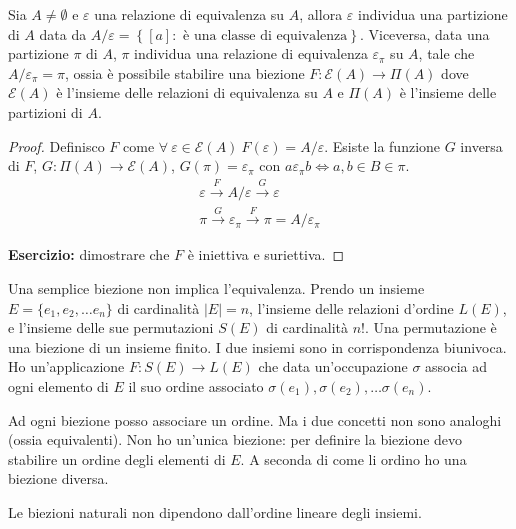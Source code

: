 \begin{prop}
Sia $A \neq \emptyset$ e $\varepsilon$ una relazione di equivalenza su $A$, allora $\varepsilon$ individua una partizione di $A$ data da $A / \varepsilon = \left \{ [a] :  \text{ \`e una classe di equivalenza}  \right \}$. Viceversa, data una partizione $\pi$ di $A$, $\pi$ individua una relazione di equivalenza $\varepsilon_{\pi}$ su $A$, tale che $A / \varepsilon_{\pi} = \pi$, ossia \`e possibile stabilire una biezione $F: \mathcal{E}(A) \to \Pi(A)$ dove $\mathcal{E}(A)$ \`e l'insieme delle relazioni di equivalenza su $A$ e $\Pi(A)$ \`e l'insieme delle partizioni di $A$.
\end{prop}
\begin{proof}
Definisco $F$ come $\forall \ \varepsilon \in \mathcal{E}(A) \ F(\varepsilon) = A / \varepsilon$. Esiste la funzione $G$ inversa di $F$, $G : \Pi(A) \to \mathcal{E}(A)$, $G(\pi) = \varepsilon_{\pi}$ con $a \varepsilon_{\pi} b \Leftrightarrow a,b \in B \in \pi$.
\begin{gather*}
\varepsilon \xrightarrow{F} A / \varepsilon \xrightarrow{G} \varepsilon \\
\pi \xrightarrow{G} \varepsilon_{\pi} \xrightarrow{F} \pi = A / \varepsilon_{\pi} 
\end{gather*}

\textbf{Esercizio:} dimostrare che $F$ \`e iniettiva e suriettiva.

\vspace{5cm}
\end{proof}

Una semplice biezione non implica l'equivalenza. Prendo un insieme $E = \{e_1, e_2, \dots e_n\}$ di cardinalit\`a $|E| = n$, l'insieme delle relazioni d'ordine $L(E)$, e l'insieme delle sue permutazioni $S(E)$ di cardinalit\`a $n!$. Una permutazione \`e una biezione di un insieme finito. I due insiemi sono in corrispondenza biunivoca. Ho un'applicazione $F : S(E) \to L(E)$ che data un'occupazione $\sigma$ associa ad ogni elemento di $E$ il suo ordine associato $\sigma(e_1), \sigma(e_2), \dots \sigma(e_n)$. 

Ad ogni biezione posso associare un ordine. Ma i due concetti non sono analoghi (ossia equivalenti). Non ho un'unica biezione: per definire la biezione devo stabilire un ordine degli elementi di $E$. A seconda di come li ordino ho una biezione diversa.

\begin{defn}
Le biezioni naturali non dipendono dall'ordine lineare degli insiemi.
\end{defn}

